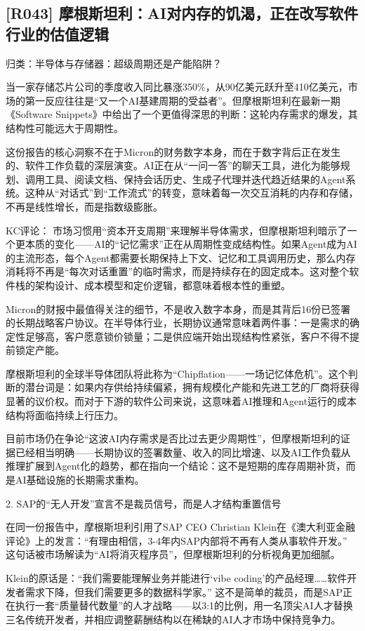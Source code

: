 \documentclass[11pt]{ctexart}
\begin{document}
\subsection{[R043] 摩根斯坦利：AI对内存的饥渴，正在改写软件行业的估值逻辑}
{\small\color{refgray}归类：半导体与存储器：超级周期还是产能陷阱？}

当一家存储芯片公司的季度收入同比暴涨350\%，从90亿美元跃升至410亿美元，市场的第一反应往往是“又一个AI基建周期的受益者”。但摩根斯坦利在最新一期《Software Snippets》中给出了一个更值得深思的判断：这轮内存需求的爆发，其结构性可能远大于周期性。

这份报告的核心洞察不在于Micron的财务数字本身，而在于数字背后正在发生的、软件工作负载的深层演变。AI正在从“一问一答”的聊天工具，进化为能够规划、调用工具、阅读文档、保持会话历史、生成子代理并迭代趋近结果的Agent系统。这种从“对话式”到“工作流式”的转变，意味着每一次交互消耗的内存和存储，不再是线性增长，而是指数级膨胀。

KC评论： 市场习惯用“资本开支周期”来理解半导体需求，但摩根斯坦利暗示了一个更本质的变化——AI的“记忆需求”正在从周期性变成结构性。如果Agent成为AI的主流形态，每个Agent都需要长期保持上下文、记忆和工具调用历史，那么内存消耗将不再是“每次对话重置”的临时需求，而是持续存在的固定成本。这对整个软件栈的架构设计、成本模型和定价逻辑，都意味着根本性的重塑。

Micron的财报中最值得关注的细节，不是收入数字本身，而是其背后16份已签署的长期战略客户协议。在半导体行业，长期协议通常意味着两件事：一是需求的确定性足够高，客户愿意锁价锁量；二是供应端开始出现结构性紧张，客户不得不提前锁定产能。

摩根斯坦利的全球半导体团队将此称为“Chipflation——一场记忆体危机”。这个判断的潜台词是：如果内存供给持续偏紧，拥有规模化产能和先进工艺的厂商将获得显著的议价权。而对于下游的软件公司来说，这意味着AI推理和Agent运行的成本结构将面临持续上行压力。

目前市场仍在争论“这波AI内存需求是否比过去更少周期性”，但摩根斯坦利的证据已经相当明确——长期协议的签署数量、收入的同比增速、以及AI工作负载从推理扩展到Agent化的趋势，都在指向一个结论：这不是短期的库存周期补货，而是AI基础设施的长期需求重构。

2. SAP的“无人开发”宣言不是裁员信号，而是人才结构重置信号

在同一份报告中，摩根斯坦利引用了SAP CEO Christian Klein在《澳大利亚金融评论》上的发言：“有理由相信，3-4年内SAP内部将不再有人类从事软件开发。” 这句话被市场解读为“AI将消灭程序员”，但摩根斯坦利的分析视角更加细腻。

Klein的原话是：“我们需要能理解业务并能进行‘vibe coding’的产品经理……软件开发者需求下降，但我们需要更多的数据科学家。” 这不是简单的裁员，而是SAP正在执行一套“质量替代数量”的人才战略——以3:1的比例，用一名顶尖AI人才替换三名传统开发者，并相应调整薪酬结构以在稀缺的AI人才市场中保持竞争力。
\end{document}
